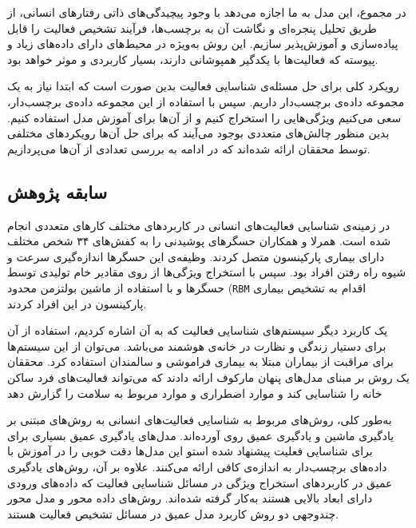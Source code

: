 در مجموع، این مدل به ما اجازه می‌دهد با وجود پیچیدگی‌های ذاتی رفتارهای انسانی، از طریق تحلیل پنجره‌ای و نگاشت آن به برچسب‌ها، فرآیند تشخیص فعالیت را قابل پیاده‌سازی و آموزش‌پذیر سازیم. این روش به‌ویژه در محیط‌های دارای داده‌های زیاد و پیوسته که فعالیت‌ها با یکدگیر همپوشانی دارند، بسیار کاربردی و موثر خواهد بود.

رویکرد کلی برای حل مسئله‌ی شناسایی فعالیت بدین صورت است که ابتدا نیاز به یک مجموعه داده‌ی
برچسب‌دار داریم. سپس با استفاده از این مجموعه داده‌ی برچسب‌دار، سعی می‌کنیم ویژگی‌هایی را استخراج کنیم و از آن‌ها برای آموزش مدل استفاده کنیم. بدین منظور چالش‌های متعددی بوجود می‌آیند که برای حل آن‌ها رویکردهای مختلفی توسط محققان ارائه شده‌اند که در ادامه به بررسی تعدادی از آن‌ها می‌پردازیم.

\subsection{سابقه پژوهش}

در زمینه‌ی شناسایی فعالیت‌های انسانی در کاربردهای مختلف کارهای متعددی انجام شده است. همرلا و همکاران\cite{hammerla2015pd}
حسگرهای پوشیدنی را به کفش‌های ۳۴ شخص مختلف دارای بیماری
پارکینسون
متصل کردند. وظیفه‌ی این حسگرها اندازه‌گیری سرعت و شیوه راه رفتن افراد بود. سپس با استخراج ویژگی‌ها از روی مقادیر خام تولیدی توسط حسگرها و با استفاده از
ماشین بولتزمن محدود (\verb|RBM|
اقدام به تشخیص بیماری پارکینسون در این افراد کردند.

یک کاربرد دیگر سیستم‌های شناسایی فعالیت که به آن اشاره کردیم، استفاده از آن برای دستیار زندگی و نظارت در خانه‌ی هوشمند می‌باشد. می‌توان از این سیستم‌ها برای مراقبت از بیماران مبتلا به
بیماری فراموشی و سالمندان استفاده کرد. محققان یک روش بر مبنای
مدل‌های پنهان مارکوف
ارائه دادند که می‌تواند فعالیت‌های فرد ساکن خانه را شناسایی کند و موارد اضطراری و موارد مربوط به سلامت را گزارش دهد\cite{asghari2018activity}

به‌طور کلی، روش‌های مربوط به شناسایی فعالیت‌های انسانی به روش‌های مبتنی بر یادگیری ماشین و یادگیری عمیق روی آورده‌اند. مدل‌های یادگیری عمیق بسیاری برای برای شناسایی فعلیت پیشنهاد شده استو این مدل‌ها دقت خوبی را در آموزش با داده‌های برچسب‌دار به اندازه‌ی کافی
ارائه می‌کنند\cite{cook2013transfer}.
علاوه بر آن، روش‌های یادگیری عمیق در کاربردهای استخراج ویژگی در مسائل شناسایی فعالیت که داده‌های ورودی دارای ابعاد بالایی هستند به‌کار گرفته شده‌اند. روش‌های
داده محور\cite{chen2015deep}
و مدل محور چندوجهی\cite{ha2015multi}
دو روش کاربرد مدل عمیق در مسائل تشخیص فعالیت هستند.


